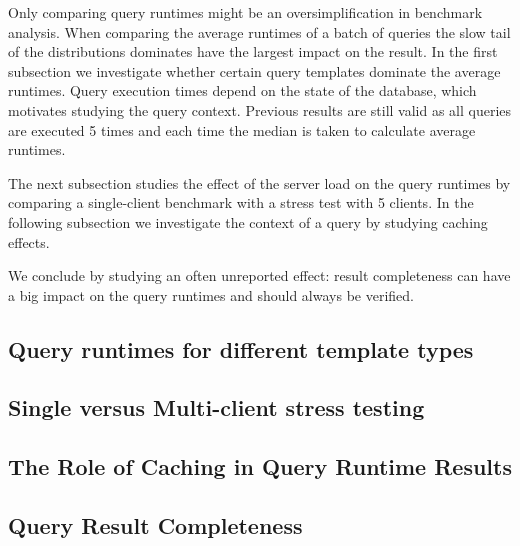 Only comparing query runtimes might be an oversimplification in benchmark analysis. 
When comparing the average runtimes of a batch of queries the slow tail of the distributions dominates have the largest impact on the result. In the first subsection
we investigate whether certain query templates dominate the average runtimes.
Query execution times depend on the state of the database, which motivates studying the query context. Previous results are still valid as all queries are executed 5 times and each time the median is taken to calculate average runtimes.

The next subsection
studies the effect of the server load on the query runtimes by comparing a single-client benchmark with a stress test with 5 clients. In the following subsection we investigate the context of a query by studying caching effects. 

We conclude by studying an often unreported effect: result completeness can have a big impact on the query runtimes and should always be verified.

\subsection{Query runtimes for different template types}
\label{subsec:templates}


\subsection{Single versus Multi-client stress testing}
\label{subsec:load}


\subsection{The Role of Caching in Query Runtime Results}
\label{subsec:caching}






\subsection{Query Result Completeness}
\label{subsec:completeness}
